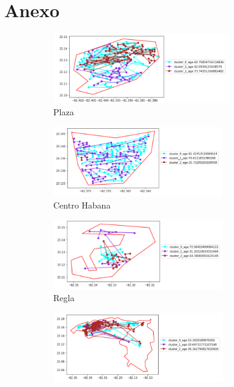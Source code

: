 \chapter*{Anexo}\label{chapter:Anexo}

  
\begin{figure}[h!]
	\centering
	\begin{subfigure}[b]{0.49\linewidth}
		\includegraphics[width=\linewidth, height=3cm]{Images/Plaza.png}
		\caption{Plaza}
		\label{fig:Plaza}
	\end{subfigure}
	\begin{subfigure}[b]{0.49\linewidth}
		\includegraphics[width=\linewidth, height=3cm]{Images/CentroHabana.png}
		\caption{Centro Habana}
		\label{fig:CentroHab}
	\end{subfigure}
	\begin{subfigure}[b]{0.49\linewidth}
		\includegraphics[width=\linewidth, height=3cm]{Images/Regla.png}
		\caption{Regla}
		\label{fig:Regla}
	\end{subfigure}
	\begin{subfigure}[b]{0.49\linewidth}
		\includegraphics[width=\linewidth, height=3cm]{Images/HabEste.png}

\end{subfigure}
\end{figure}
